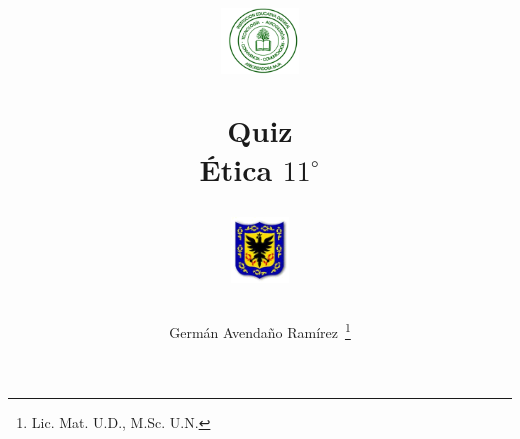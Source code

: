 \documentclass[10pt,addpoints]{exam}
\begin{document}
\title{\begin{minipage}{.2\textwidth}
        \includegraphics[height=1.75cm]{Images/logo-colegio.png}
       \end{minipage}
\begin{minipage}{.55\textwidth}
 \begin{center}
Quiz \\Ética $11^{\circ}$
\end{center}
\end{minipage}
\begin{minipage}{.2\textwidth}
\includegraphics[height=1.75cm]{Images/logo-sed.png} 
\end{minipage}
}
\author{Germ\'{a}n Avendaño Ram\'{i}rez~\thanks{Lic. Mat. U.D., M.Sc. U.N.}}
\date{}
\maketitle
  \vspace*{-.5in}
\begin{center}
\end{center}
\vspace{0.1in}
\end{document}
